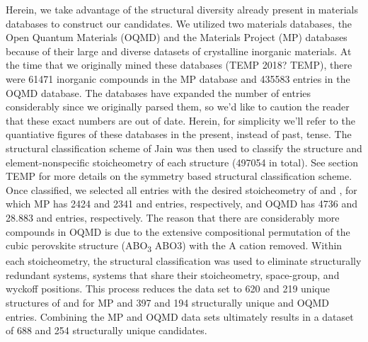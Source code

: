 Herein, we take advantage of the structural diversity already present in materials databases to construct our candidates.
%
We utilized two materials databases, the Open Quantum Materials (OQMD) and the Materials Project (MP) databases because of their large and diverse datasets of crystalline inorganic materials.
%
At the time that we originally mined these databases (TEMP 2018? TEMP), there were \num{61471} inorganic compounds in the MP database and \num{435583} entries in the OQMD database.
%
The databases have expanded the number of entries considerably since we originally parsed them, so we'd like to caution the reader that these exact numbers are out of date.
%
Herein, for simplicity we'll refer to the quantiative figures of these databases in the present, instead of past, tense.
%
The structural classification scheme of Jain  \cite{Jain2018} was then used to classify the structure and element-nonspecific stoicheometry of each structure (\num{497054} in total).
%
See section TEMP for more details on the symmetry based structural classification scheme.
%
Once classified, we selected all entries with the desired stoicheometry of \ABtwo and \ABthree,
for which MP has \num{2424} and \num{2341} \ABtwo and \ABthree entries, respectively,
and OQMD has \num{4736} and \num{28,883} \ABtwo and \ABthree entries, respectively.
%
The reason that there are considerably more \ABthree compounds in OQMD is due to the extensive compositional permutation of the cubic perovskite structure (ABO\textsubscript{3} ABO3) with the A cation removed.
%
Within each stoicheometry, the structural classification was used to eliminate structurally redundant systems,  systems that share their stoicheometry, space-group, and wyckoff positions.
%
This process reduces the data set to \num{620} and \num{219} unique structures of \ABtwo and \ABthree for MP and \num{397} and \num{194} structurally unique \ABtwo and \ABthree OQMD entries.
%
Combining the MP and OQMD data sets ultimately results in a dataset of \num{688} \ABtwo and \num{254} \ABthree structurally unique candidates.
%

